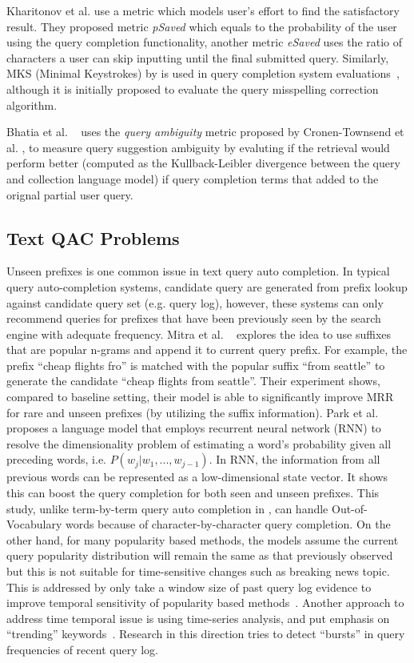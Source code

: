 \documentclass[12pt]{article} %
\begin{document}
Kharitonov et al. \cite{kharitonov_user_2013} use a metric which models user's effort to find the satisfactory result.
They proposed metric \textit{pSaved} which equals to the probability of the user using the query completion functionality, another metric \textit{eSaved} 
 uses the ratio of characters a user can skip inputting until the final submitted query.
Similarly,
MKS (Minimal Keystrokes) by \cite{duan_online_2011}
is used in query completion system evaluations~\cite{kharitonov_user_2013}, although it is initially proposed to evaluate the query misspelling correction algorithm.

Bhatia et al. ~\cite{bhatia_query_2011} uses the \textit{query ambiguity} metric proposed by Cronen-Townsend et al. \cite{predicting_2002}, to measure query suggestion ambiguity by evaluting if the retrieval would perform better (computed as the Kullback-Leibler divergence between the query and collection language model) if query completion terms that added to the orignal partial user query.


\subsection{Text QAC Problems}
Unseen prefixes is one common issue in text query auto completion.
In typical query auto-completion systems, candidate query are generated from prefix lookup against candidate query set (e.g. query log), however, these systems
 can only recommend queries for prefixes that have been previously seen by the search engine with adequate frequency.
Mitra et al. ~\cite{mitra_query_2015} explores the idea to use suffixes that are popular n-grams and append it to current query prefix.
For example, the prefix ``cheap flights fro'' is matched with the popular suffix ``from seattle'' to generate the candidate ``cheap flights from seattle''.
Their experiment shows, compared to baseline setting, their model is able to significantly improve MRR for rare and unseen prefixes (by utilizing the suffix information).
%
Park et al. \cite{park_neural_2017} proposes a language model that employs recurrent neural network (RNN) to resolve the dimensionality problem of estimating a word's probability given all preceding words, i.e. $P(w_j | w_1, ..., w_{j-1})$. In RNN, the information from all previous words can be represented as a low-dimensional state vector.
It shows this can boost the query completion for both seen and unseen prefixes.
This study, unlike term-by-term query auto completion in \cite{vargas_term-by-term_2016}, can handle Out-of-Vocabulary words because of character-by-character query completion.
On the other hand, for many popularity based methods, the models assume the current query popularity distribution will remain the same as that previously observed but this is not suitable for time-sensitive changes such as breaking news topic. This is addressed by only take a window size of past query log evidence to improve temporal sensitivity of popularity based methods~\cite{cai_survey_2016}.
Another approach to address time temporal issue is using time-series analysis, and put emphasis on ``trending'' keywords~\cite{shokouhi_detecting_2011}.
Research in this direction tries to detect ``bursts'' in query frequencies of recent query log.
\end{document}
